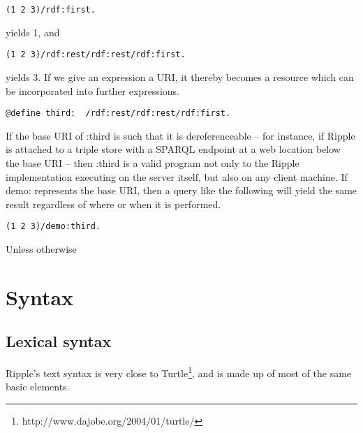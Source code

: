 \documentclass[runningheads]{llncs}
\begin{document}
\begin{verbatim}
(1 2 3)/rdf:first.
\end{verbatim}

yields 1, and

\begin{verbatim}
(1 2 3)/rdf:rest/rdf:rest/rdf:first.
\end{verbatim}

yields 3.  If we give an expression a URI, it thereby becomes a resource which can be incorporated into further expressions.

\begin{verbatim}
@define third:  /rdf:rest/rdf:rest/rdf:first.
\end{verbatim}

If the base URI of :third is such that it is dereferenceable -- for instance, if Ripple is attached to a triple store with a SPARQL endpoint at a web location below the base URI -- then :third is a valid program not only to the Ripple implementation executing on the server itself, but also on any client machine.  If demo: represents the base URI, then a query like the following will yield the same result regardless of where or when it is performed.

\begin{verbatim}
(1 2 3)/demo:third.
\end{verbatim}









Unless otherwise






\section{Syntax}


\subsection{Lexical syntax}


Ripple's text syntax is very close to Turtle\footnote{http://www.dajobe.org/2004/01/turtle/}, and is made up of most
of the same basic elements.
\newline
\end{document}
